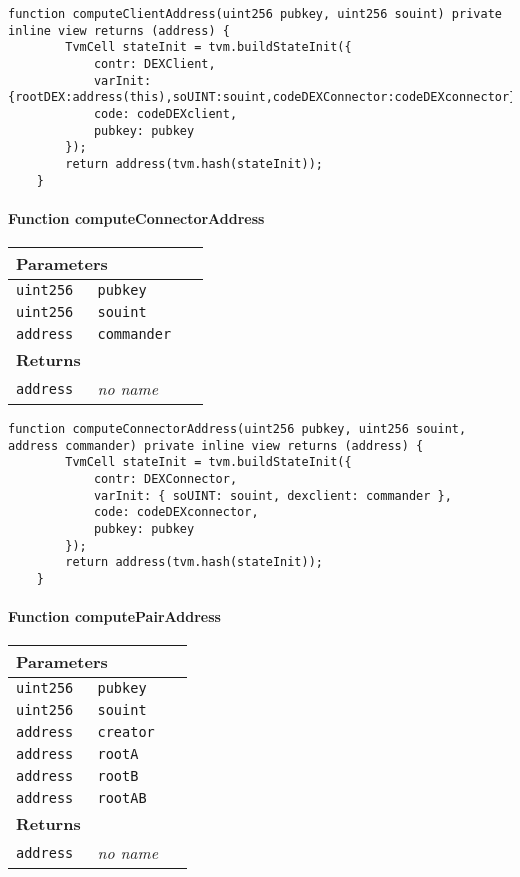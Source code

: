 \begin{lstlisting}[firstnumber=108]
	function computeClientAddress(uint256 pubkey, uint256 souint) private inline view returns (address) {
		TvmCell stateInit = tvm.buildStateInit({
			contr: DEXClient,
			varInit: {rootDEX:address(this),soUINT:souint,codeDEXConnector:codeDEXconnector},
			code: codeDEXclient,
			pubkey: pubkey
		});
		return address(tvm.hash(stateInit));
	}
\end{lstlisting}

\paragraph{Function computeConnectorAddress}


\ifsoltables
\noindent\begin{tabular}{|l|l|p{5cm}|}\hline
\multicolumn{3}{|l|}{\bf Parameters}\\\hline
\tt uint256 & \tt pubkey &\\\hline
\tt uint256 & \tt souint &\\\hline
\tt address & \tt commander &\\\hline
\multicolumn{3}{|l|}{\bf Returns}\\\hline
\tt address & {\em no name} &\\\hline
\end{tabular}
\fi

\vspace{2cm}

\begin{lstlisting}[firstnumber=223]
	function computeConnectorAddress(uint256 pubkey, uint256 souint, address commander) private inline view returns (address) {
		TvmCell stateInit = tvm.buildStateInit({
			contr: DEXConnector,
			varInit: { soUINT: souint, dexclient: commander },
			code: codeDEXconnector,
			pubkey: pubkey
		});
		return address(tvm.hash(stateInit));
	}
\end{lstlisting}

\paragraph{Function computePairAddress}


\ifsoltables
\noindent\begin{tabular}{|l|l|p{5cm}|}\hline
\multicolumn{3}{|l|}{\bf Parameters}\\\hline
\tt uint256 & \tt pubkey &\\\hline
\tt uint256 & \tt souint &\\\hline
\tt address & \tt creator &\\\hline
\tt address & \tt rootA &\\\hline
\tt address & \tt rootB &\\\hline
\tt address & \tt rootAB &\\\hline
\multicolumn{3}{|l|}{\bf Returns}\\\hline
\tt address & {\em no name} &\\\hline
\end{tabular}
\fi

